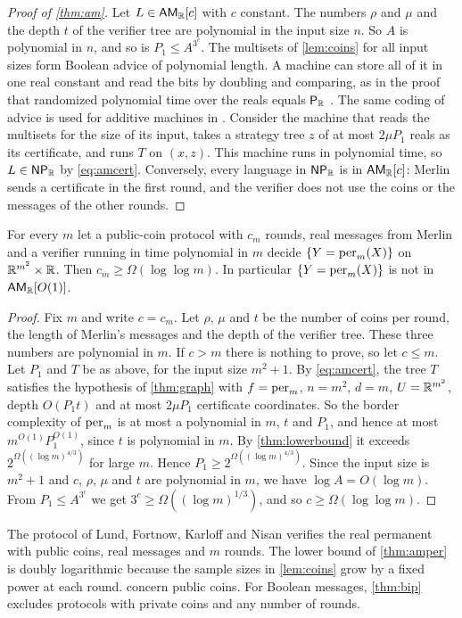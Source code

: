 \begin{proof}[Proof of \cref{thm:am}]
Let $L\in\textsf{\upshape AM}_{\mathbb{R}}[c]$ with $c$ constant.
The numbers $\rho$ and $\mu$ and the depth $t$ of the verifier tree are polynomial in the input size $n$.
So $A$ is polynomial in $n$, and so is $P_1\le A^{3^c}$.
The multisets of \cref{lem:coins} for all input sizes form Boolean advice of polynomial length.
A machine can store all of it in one real constant and read the bits by doubling and comparing, as in the proof that randomized polynomial time over the reals equals $\textsf{\upshape P}_{\mathbb{R}}$ \cite{CKKLW95}. The same coding of advice is used for additive machines in \cite{Koi94}.
Consider the machine that reads the multisets for the size of its input, takes a strategy tree $z$ of at most $2\mu P_1$ reals as its certificate, and runs $T$ on $(x,z)$.
This machine runs in polynomial time, so $L\in\textsf{\upshape NP}_{\mathbb{R}}$ by \eqref{eq:amcert}.
Conversely, every language in $\textsf{\upshape NP}_{\mathbb{R}}$ is in $\textsf{\upshape AM}_{\mathbb{R}}[c]$: Merlin sends a certificate in the first round, and the verifier does not use the coins or the messages of the other rounds.
\end{proof}

\begin{theorem}\label{thm:amper}
For every $m$ let a public-coin protocol with $c_m$ rounds, real messages from Merlin and a verifier running in time polynomial in $m$ decide $\{Y=\operatorname{per}_m(X)\}$ on $\mathbb{R}^{m^2}\times\mathbb{R}$.
Then $c_m\ge\Omega(\log\log m)$.
In particular $\{Y=\operatorname{per}_m(X)\}$ is not in $\textsf{\upshape AM}_{\mathbb{R}}[O(1)]$.
\end{theorem}

\begin{proof}
Fix $m$ and write $c=c_m$.
Let $\rho$, $\mu$ and $t$ be the number of coins per round, the length of Merlin's messages and the depth of the verifier tree.
These three numbers are polynomial in $m$.
If $c>m$ there is nothing to prove, so let $c\le m$.
Let $P_1$ and $T$ be as above, for the input size $m^2+1$.
By \eqref{eq:amcert}, the tree $T$ satisfies the hypothesis of \cref{thm:graph} with $f=\operatorname{per}_m$, $n=m^2$, $d=m$, $U=\mathbb{R}^{m^2}$, depth $O(P_1t)$ and at most $2\mu P_1$ certificate coordinates.
So the border complexity of $\operatorname{per}_m$ is at most a polynomial in $m$, $t$ and $P_1$, and hence at most $m^{O(1)}P_1^{O(1)}$, since $t$ is polynomial in $m$.
By \cref{thm:lowerbound} it exceeds $2^{\Omega((\log m)^{4/3})}$ for large $m$.
Hence $P_1\ge2^{\Omega((\log m)^{4/3})}$.
Since the input size is $m^2+1$ and $c$, $\rho$, $\mu$ and $t$ are polynomial in $m$, we have $\log A=O(\log m)$.
From $P_1\le A^{3^c}$ we get $3^c\ge\Omega((\log m)^{1/3})$, and so $c\ge\Omega(\log\log m)$.
\end{proof}

The protocol of Lund, Fortnow, Karloff and Nisan \cite{LFKN92} verifies the real permanent with public coins, real messages and $m$ rounds.
The lower bound of \cref{thm:amper} is doubly logarithmic because the sample sizes in \cref{lem:coins} grow by a fixed power at each round.
 concern public coins.
For Boolean messages, \cref{thm:bip} excludes protocols with private coins and any number of rounds.
